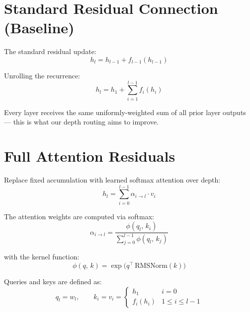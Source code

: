 \documentclass[11pt]{article}
\begin{document}
\section{Standard Residual Connection (Baseline)}

The standard residual update:
\begin{equation}
    h_l = h_{l-1} + f_{l-1}(h_{l-1})
\end{equation}

Unrolling the recurrence:
\begin{equation}
    h_l = h_1 + \sum_{i=1}^{l-1} f_i(h_i)
\end{equation}

Every layer receives the same uniformly-weighted sum of all prior layer outputs --- this is what our depth routing aims to improve.


\section{Full Attention Residuals}

Replace fixed accumulation with learned softmax attention over depth:
\begin{equation}
    h_l = \sum_{i=0}^{l-1} \alpha_{i \to l} \cdot v_i
\end{equation}

The attention weights are computed via softmax:
\begin{equation}
    \alpha_{i \to l} = \frac{\phi(q_l,\, k_i)}{\sum_{j=0}^{l-1} \phi(q_l,\, k_j)}
\end{equation}

with the kernel function:
\begin{equation}
    \phi(q,\, k) = \exp\!\Big(q^{\top}\, \mathrm{RMSNorm}(k)\Big)
\end{equation}

Queries and keys are defined as:
\begin{equation}
    q_l = w_l, \qquad
    k_i = v_i =
    \begin{cases}
        h_1        & i = 0 \\
        f_i(h_i)   & 1 \le i \le l-1
    \end{cases}
\end{equation}
\end{document}
